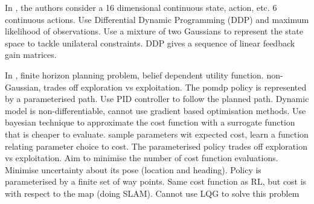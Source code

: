 In \cite{Erez10ascalable}, the authors consider a 16 dimensional continuous state, action, etc. 6 continuous actions. Use Differential Dynamic Programming (DDP) and maximum likelihood 
of observations. Use a mixture of two Gaussians to represent the state space to tackle unilateral constraints. DDP gives a sequence of linear feedback gain matrices.	

In \cite{Martinez-Cantin2009}, finite horizon planning problem, belief dependent utility function. non-Gaussian, trades off exploration vs exploitation. The pomdp
policy is represented by a parameterised path. Use PID controller to follow the planned path. Dynamic model is non-differentiable, cannot use gradient based optimisation methods.
Use bayesian technique to approximate the cost function with a surrogate function that is cheaper to evaluate.
sample parameters wit expected cost, learn a function relating parameter choice to cost. The parameterised policy trades off exploration vs exploitation. Aim to 
minimise the number of cost function evaluations. Minimise uncertainty about its pose (location and heading). Policy is parameterised by a finite set of way points.	
Same cost function as RL, but cost is with respect to the map (doing SLAM). Cannot use LQG to solve this problem 




